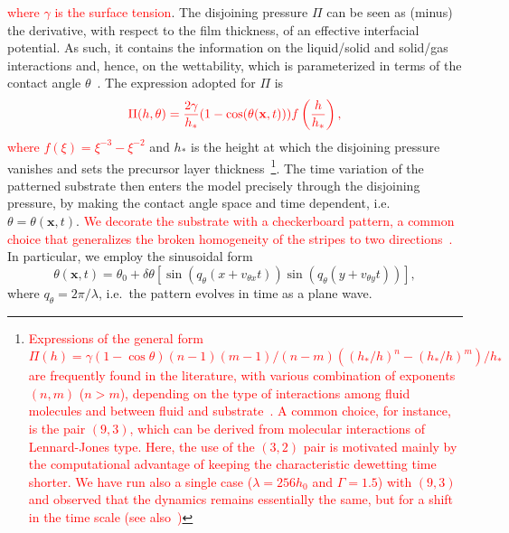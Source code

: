 \documentclass[twocolumn,amsmath,amssymb,showpacs,prl,superscriptaddress]{revtex4-1} %
\begin{document}
\textcolor{red}{where $\gamma$ is the surface tension}.
The disjoining pressure $\Pi$ can be seen as (minus) the derivative, with respect to the film thickness, of an effective interfacial potential.
As such, it contains the information on the liquid/solid and solid/gas interactions and, hence, on the wettability, which is parameterized in terms of the contact angle $\theta$~\cite{RevModPhys.81.739, SCHWARTZ1998173}. 
The expression adopted for $\Pi$ is
\begin{equation}\label{eq:disjoinpressure}
\textcolor{red}{\Pi(h,\theta) = \frac{2\gamma}{h_{\ast}}(1-\cos(\theta(\mathbf{x},t)))
  f\left(\frac{h}{h_{\ast}}\right),}
\end{equation}
\textcolor{red}{where $f(\xi)=\xi^{-3} - \xi^{-2}$} and $h_{\ast}$ is the height at which the disjoining pressure vanishes and sets the precursor layer thickness~\footnote{\textcolor{red}{Expressions of 
the general form $\Pi(h) = \gamma(1-\cos \theta)(n-1)(m-1)/(n-m)((h_{\ast}/h)^n - (h_{\ast}/h)^m)/h_{\ast}$
are frequently found in the literature, with various combination of exponents $(n,m)$ ($n>m$), depending
on the type of interactions among fluid molecules and between fluid and substrate~\cite{SCHWARTZ1998173,Mitlin,Teletzke}. A common choice, for instance, is the pair $(9,3)$, which 
can be derived from molecular interactions of Lennard-Jones type. Here, the use of the $(3,2)$ pair is motivated mainly by the computational advantage of keeping the characteristic dewetting time 
shorter. We have run also a single case ($\lambda=256 h_0$ and $\Gamma=1.5$) with $(9,3)$ and observed that 
the dynamics remains essentially the same, but for a shift in the time scale (see also~\cite{PhysRevE.104.034801})}}.
The time variation of the patterned substrate then enters the model precisely through the disjoining pressure, by making the contact angle space and time dependent, i.e. $\theta = \theta(\mathbf{x},t)$.
\textcolor{red}{We decorate the substrate with a checkerboard pattern, a common choice that generalizes the broken homogeneity of the stripes to two 
directions~\cite{KarguptaLangmuir2003,Jalali2018,Nagayama2020,Das2020}.}
In particular, we employ the sinusoidal form
\begin{equation}\label{eq:sinetheta}
   \!\! \theta(\mathbf{x},t) = \theta_0 + \delta\theta\left[\sin\left(q_{\theta} (x+v_{\theta x}t)\right)\sin\left(q_{\theta}(y+v_{\theta y}t)\right)\right],\! 
\end{equation}
where $q_{\theta} = 2\pi/\lambda$, i.e.~the pattern evolves in time as a plane wave.
\end{document}
